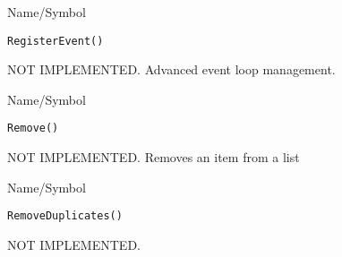 \rl




\begin{desc}{Name/Symbol}
\item[Name/Symbol]  	\verb+RegisterEvent()+

\item[Description]	NOT IMPLEMENTED.  Advanced event loop management.

\item[Usage]		

\item[Example]	

\item[See Also]	
\end{desc}

\rl






\begin{desc}{Name/Symbol}
\item[Name/Symbol]  	\verb+Remove()+

\item[Description]  	NOT IMPLEMENTED.  Removes an item from a list

\item[Usage]		

\item[Example]	

\item[See Also]	
\end{desc}

\rl


\begin{desc}{Name/Symbol}
\item[Name/Symbol]	\verb+RemoveDuplicates()+

\item[Description]	NOT IMPLEMENTED.

\item[Usage]		

\item[Example]	

\item[See Also]	 
\end{desc}

\rl


